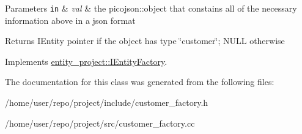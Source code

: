 \begin{DoxyParams}[1]{Parameters}
\mbox{\tt in}  & {\em val} & the picojson\+::object that constains all of the necessary information above in a json format \\
\hline
\end{DoxyParams}
\begin{DoxyReturn}{Returns}
I\+Entity pointer if the object has type \char`\"{}customer\char`\"{}; N\+U\+LL otherwise 
\end{DoxyReturn}


Implements \hyperlink{classentity__project_1_1IEntityFactory_ac4e8eaf4294958fef0b98bd3684704bb}{entity\+\_\+project\+::\+I\+Entity\+Factory}.



The documentation for this class was generated from the following files\+:\begin{DoxyCompactItemize}
\item 
/home/user/repo/project/include/customer\+\_\+factory.\+h\item 
/home/user/repo/project/src/customer\+\_\+factory.\+cc\end{DoxyCompactItemize}
